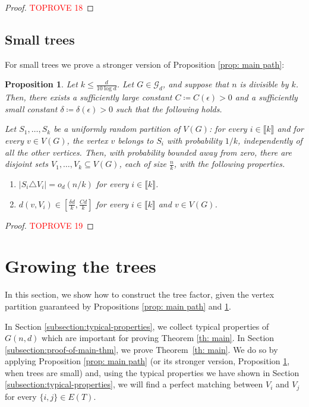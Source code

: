 \documentclass[notitlepage]{scrartcl}
\newcommand{\br}[1]{\llbracket{#1}\rrbracket}
\newtheorem{proposition}[thm]{Proposition}
\begin{document}
\begin{proof}\textcolor{red}{TOPROVE 18}\end{proof}

\subsection{Small trees}\label{s: small prop}
For small trees we prove a stronger version of Proposition \ref{prop: main path}:
\begin{proposition}\label{prop: main small k}
Let $k\le \frac{d}{10\log d}$. Let $G\in \mathcal{G}_d$, and suppose that $n$ is divisible by $k$. Then, there exists a sufficiently large constant $C\coloneqq C(\epsilon)>0$ and a sufficiently small constant $\delta\coloneqq \delta(\epsilon)>0$ such that the following holds.

Let $S_1,\ldots, S_k$ be a uniformly random partition of $V(G)$: for every $i\in\br{k}$ and for every $v\in V(G)$, the vertex $v$ belongs to $S_i$ with probability $1/k$, independently of all the other vertices. Then, with probability bounded away from zero, there are disjoint sets $V_1,\ldots, V_k\subseteq V(G)$, each of size $\frac{n}{k}$, with the following properties.
\begin{enumerate}[(P\arabic*{})]
    \item $|S_i\triangle V_i|=o_d(n/k)$ for every $i\in \br{k}$. \label{p: close to uniform small}
    \item $d(v,V_i)\in \left[\frac{\delta d}{k},\frac{Cd}{k}\right]$ for every $i\in \br{k}$ and $v\in V(G)$. \label{p: good degree between small}
\end{enumerate}
\end{proposition}
\begin{proof}\textcolor{red}{TOPROVE 19}\end{proof}

\section{Growing the trees}\label{s: theorems proof}
In this section, we show how to construct the tree factor, given the vertex partition guaranteed by Propositions \ref{prop: main path} and \ref{prop: main small k}. 

In Section \ref{subsection:typical-properties}, we collect typical properties of $G(n, d)$ which are important for proving Theorem \ref{th: main}. In Section \ref{subsection:proof-of-main-thm}, we prove Theorem~\ref{th: main}. We do so by applying Proposition \ref{prop: main path} (or its stronger version, Proposition \ref{prop: main small k}, when trees are small) and, using the typical properties we have shown in Section \ref{subsection:typical-properties}, we will find a perfect matching between $V_i$ and $V_j$ for every $\{i,j\} \in E(T)$.
\end{document}
